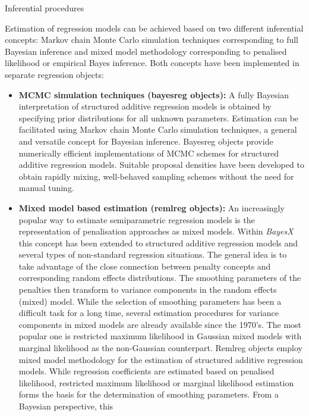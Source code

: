 \begin{stanza}{Inferential procedures}

Estimation of regression models can be achieved based on two
different inferential concepts: Markov chain Monte Carlo
simulation techniques corresponding to full Bayesian inference and
mixed model methodology corresponding to penalised likelihood or
empirical Bayes inference. Both concepts have been implemented in
separate regression objects:

\begin{itemize}
\item {\bf\sffamily MCMC simulation techniques (bayesreg objects):} A fully Bayesian interpretation of structured additive
    regression models is obtained by specifying prior distributions for all unknown parameters. Estimation can be
    facilitated using Markov chain Monte Carlo simulation techniques, a general and versatile concept for Bayesian
    inference. Bayesreg objects provide numerically efficient implementations of MCMC schemes for structured additive
    regression models. Suitable proposal densities have been developed to obtain rapidly mixing, well-behaved sampling
    schemes without the need for manual tuning.
\item{\bf\sffamily Mixed model based estimation (remlreg objects):} An increasingly popular way to estimate semiparametric
    regression models is the representation of penalisation approaches as mixed models. Within {\em BayesX }this concept
    has been extended to structured additive regression  models and several types of non-standard regression situations.
    The general idea is to take advantage of the close  connection between penalty concepts and corresponding random
    effects distributions. The smoothing parameters of the  penalties then transform to variance components in the random
    effects (mixed) model. While the selection of smoothing  parameters has been a difficult task for a long time, several
    estimation procedures for variance components in mixed models are already available since the 1970's. The most popular
    one is restricted maximum likelihood in Gaussian mixed models with marginal likelihood as the non-Gaussian counterpart.
    Remlreg objects employ mixed model methodology for the estimation of structured additive regression models. While
    regression coefficients are estimated based on penalised likelihood, restricted maximum likelihood or marginal
    likelihood estimation forms the basis for the determination of smoothing parameters. From a Bayesian perspective, this

\end{itemize}
\end{stanza}

